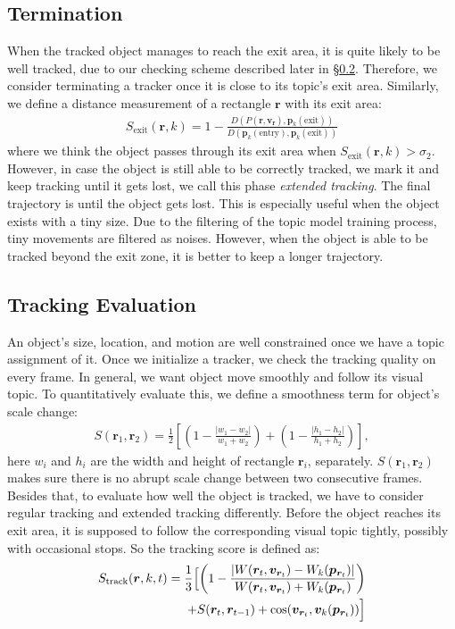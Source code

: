 \subsection{Termination}
    When the tracked object manages to reach the exit area, it is quite likely to be well tracked, due to our checking scheme described later in \S\ref{sec:track_eval}. Therefore, we consider terminating a tracker once it is close to its topic's exit area. 
    Similarly, we define a distance measurement of a rectangle $\bm{r}$ with its exit area:
    \begin{align}
        S_\text{exit}(\bm{r}, k) = 1-\frac{D\left(P(\bm{r}, \bm{v_r}), \bm{p}_k(\text{exit})\right)}{D\left(\bm{p}_k(\text{entry}), \bm{p}_k(\text{exit})\right)}
    \end{align}
    where we think the object passes through its exit area when $S_\text{exit}(\bm{r}, k) > \sigma_2$.
    However, in case the object is still able to be correctly tracked, we mark it and keep tracking until it gets lost, we call this phase \emph{extended tracking}. 
    The final trajectory is until the object gets lost. This is especially useful when the object exists with a tiny size. Due to the filtering of the topic model training process, tiny movements are filtered as noises. However, when the object is able to be tracked beyond the exit zone, it is better to keep a longer trajectory. 

\subsection{Tracking Evaluation}
\label{sec:track_eval}
An object's size, location, and motion are well constrained once we have a topic assignment of it. 
Once we initialize a tracker, we check the tracking quality on every frame. In general, we want object move smoothly and follow its visual topic. To quantitatively evaluate this, we define a smoothness term for object's scale change:
\begin{align}
    S(\bm{r}_1, \bm{r}_2) = \frac{1}{2}\left[\left(1-\frac{|w_1- w_2|}{w_1 + w_2}\right) + \left(1-\frac{|h_1 - h_2|}{h_1 + h_2}\right)\right], 
\end{align}
here $w_i$ and $h_i$ are the width and height of rectangle $\bm{r}_{i}$, separately. $S(\bm{r}_1, \bm{r}_2)$ makes sure there is no abrupt scale change between two consecutive frames.
Besides that, to evaluate how well the object is tracked, we have to consider regular tracking and extended tracking differently. 
Before the object reaches its exit area, it is supposed to follow the corresponding visual topic tightly, possibly with occasional stops. So the tracking score is defined as:
\begin{align}
\begin{split}
    S_{\text{track}}(\bm{r}, k, t) = \frac{1}{3}\Bigl[\left(1 - \frac{|W(\bm{r}_t, \bm{v}_{\bm{r}_t}) - W_k(\bm{p}_{\bm{r}_t})|}{W(\bm{r}_t, \bm{v}_{\bm{r}_t}) + W_k(\bm{p}_{\bm{r}_t})}\right) \\
    + S(\bm{r}_t, \bm{r}_{t-1}) + \cos(\bm{v}_{\bm{r}_t}, \bm{v}_k(\bm{p}_{\bm{r}_t}))\Bigl]
\end{split}
\label{eq:track_score}
\end{align}

